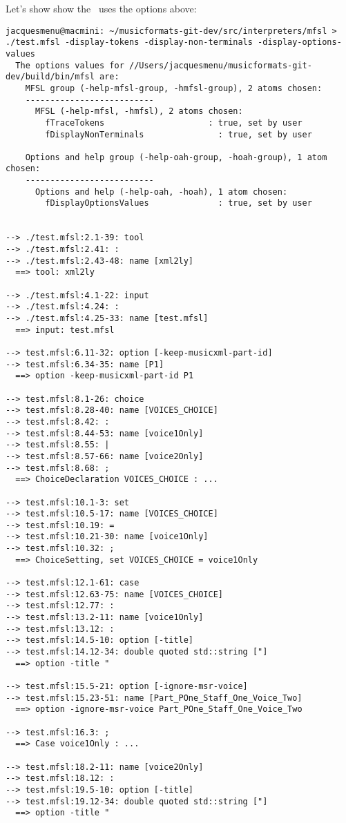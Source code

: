 Let's show show the \mfslInterp\ uses the options above:
\begin{lstlisting}[language=Terminal]
jacquesmenu@macmini: ~/musicformats-git-dev/src/interpreters/mfsl > ./test.mfsl -display-tokens -display-non-terminals -display-options-values
  The options values for //Users/jacquesmenu/musicformats-git-dev/build/bin/mfsl are:
    MFSL group (-help-mfsl-group, -hmfsl-group), 2 atoms chosen:
    --------------------------
      MFSL (-help-mfsl, -hmfsl), 2 atoms chosen:
        fTraceTokens                     : true, set by user
        fDisplayNonTerminals               : true, set by user

    Options and help group (-help-oah-group, -hoah-group), 1 atom chosen:
    --------------------------
      Options and help (-help-oah, -hoah), 1 atom chosen:
        fDisplayOptionsValues              : true, set by user


--> ./test.mfsl:2.1-39: tool
--> ./test.mfsl:2.41: :
--> ./test.mfsl:2.43-48: name [xml2ly]
  ==> tool: xml2ly

--> ./test.mfsl:4.1-22: input
--> ./test.mfsl:4.24: :
--> ./test.mfsl:4.25-33: name [test.mfsl]
  ==> input: test.mfsl

--> test.mfsl:6.11-32: option [-keep-musicxml-part-id]
--> test.mfsl:6.34-35: name [P1]
  ==> option -keep-musicxml-part-id P1

--> test.mfsl:8.1-26: choice
--> test.mfsl:8.28-40: name [VOICES_CHOICE]
--> test.mfsl:8.42: :
--> test.mfsl:8.44-53: name [voice1Only]
--> test.mfsl:8.55: |
--> test.mfsl:8.57-66: name [voice2Only]
--> test.mfsl:8.68: ;
  ==> ChoiceDeclaration VOICES_CHOICE : ...

--> test.mfsl:10.1-3: set
--> test.mfsl:10.5-17: name [VOICES_CHOICE]
--> test.mfsl:10.19: =
--> test.mfsl:10.21-30: name [voice1Only]
--> test.mfsl:10.32: ;
  ==> ChoiceSetting, set VOICES_CHOICE = voice1Only

--> test.mfsl:12.1-61: case
--> test.mfsl:12.63-75: name [VOICES_CHOICE]
--> test.mfsl:12.77: :
--> test.mfsl:13.2-11: name [voice1Only]
--> test.mfsl:13.12: :
--> test.mfsl:14.5-10: option [-title]
--> test.mfsl:14.12-34: double quoted std::string ["]
  ==> option -title "

--> test.mfsl:15.5-21: option [-ignore-msr-voice]
--> test.mfsl:15.23-51: name [Part_POne_Staff_One_Voice_Two]
  ==> option -ignore-msr-voice Part_POne_Staff_One_Voice_Two

--> test.mfsl:16.3: ;
  ==> Case voice1Only : ...

--> test.mfsl:18.2-11: name [voice2Only]
--> test.mfsl:18.12: :
--> test.mfsl:19.5-10: option [-title]
--> test.mfsl:19.12-34: double quoted std::string ["]
  ==> option -title "


\end{lstlisting}
